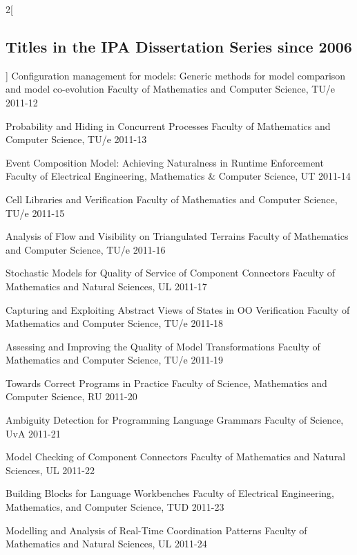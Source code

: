 \begin{multicols}{2}[\subsection*{Titles in the IPA Dissertation Series since 2006}]
         {Configuration management for models: Generic methods for model comparison and model co-evolution}
         {Faculty of Mathematics and Computer Science, TU/e}
         {2011-12}

         {Probability and Hiding in Concurrent Processes}
         {Faculty of Mathematics and Computer Science, TU/e}
         {2011-13}

         {Event Composition Model: Achieving Naturalness in Runtime Enforcement}
         {Faculty of Electrical Engineering, Mathematics \& Computer Science, UT}
         {2011-14}

         {Cell Libraries and Verification}
         {Faculty of Mathematics and Computer Science, TU/e}
         {2011-15}

         {Analysis of Flow and Visibility on Triangulated Terrains}
         {Faculty of Mathematics and Computer Science, TU/e}
         {2011-16}

         {Stochastic Models for Quality of Service of Component Connectors}
         {Faculty of Mathematics and Natural Sciences, UL}
         {2011-17}

         {Capturing and Exploiting Abstract Views of States in OO Verification}
         {Faculty of Mathematics and Computer Science, TU/e}
         {2011-18}

         {Assessing and Improving the Quality of Model Transformations}
         {Faculty of Mathematics and Computer Science, TU/e}
         {2011-19}

         {Towards Correct Programs in Practice}
         {Faculty of Science, Mathematics and Computer Science, RU}
         {2011-20}

         {Ambiguity Detection for Programming Language Grammars}
         {Faculty of Science, UvA}
         {2011-21}

         {Model Checking of Component Connectors}
         {Faculty of Mathematics and Natural Sciences, UL}
         {2011-22}

         {Building Blocks for Language Workbenches}
         {Faculty of Electrical Engineering, Mathematics, and Computer Science, TUD}
         {2011-23}

         {Modelling and Analysis of Real-Time Coordination Patterns}
         {Faculty of Mathematics and Natural Sciences, UL}
         {2011-24}


\end{multicols}
